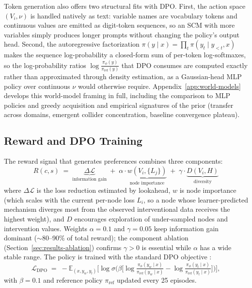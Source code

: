 \documentclass{article}
\theoremstyle{plain}
\theoremstyle{definition}
\theoremstyle{remark}
\begin{document}
Token generation also offers two structural fits with DPO. First, the action space $(V_i, \nu)$ is handled natively as text: variable names are vocabulary tokens and continuous values are emitted as digit-token sequences, so an SCM with more variables simply produces longer prompts without changing the policy's output head. Second, the autoregressive factorization $\pi(y \mid x) = \prod_t \pi(y_t \mid y_{<t}, x)$ makes the sequence log-probability a closed-form sum of per-token log-softmaxes, so the log-probability ratios $\log\tfrac{\pi_\phi(y)}{\pi_\text{ref}(y)}$ that DPO consumes are computed exactly rather than approximated through density estimation, as a Gaussian-head MLP policy over continuous $\nu$ would otherwise require. Appendix~\ref{app:world-models} develops this world-model framing in full, including the comparison to MLP policies and greedy acquisition and empirical signatures of the prior (transfer across domains, emergent collider concentration, baseline convergence plateau).

\subsection{Reward and DPO Training}
\label{sec:dpo}

The reward signal that generates preferences combines three components:
\begin{equation}
\label{eq:reward}
R(c, s) \;=\; \underbrace{\Delta\mathcal{L}}_{\text{information gain}} \;+\; \alpha \cdot \underbrace{w(V_i, \{L_j\})}_{\text{node importance}} \;+\; \gamma \cdot \underbrace{D(V_i, H)}_{\text{diversity}}
\end{equation}
where $\Delta\mathcal{L}$ is the loss reduction estimated by lookahead, $w$ is node importance (which scales with the current per-node loss $L_i$, so a node whose learner-predicted mechanism diverges most from the observed interventional data receives the highest weight), and $D$ encourages exploration of under-sampled nodes and intervention values. Weights $\alpha = 0.1$ and $\gamma = 0.05$ keep information gain dominant ($\sim$80--90\% of total reward); the component ablation (Section~\ref{sec:results-ablation}) confirms $\gamma > 0$ is essential while $\alpha$ has a wide stable range. The policy is trained with the standard DPO objective \citep{rafailov2023direct}:
\begin{equation}
\label{eq:dpo-loss}
\mathcal{L}_{\text{DPO}} \;=\; -\mathbb{E}_{(x, y_w, y_l)}\Big[\log\sigma\Big(\beta\big[\log\tfrac{\pi_\phi(y_w \mid x)}{\pi_\text{ref}(y_w \mid x)} - \log\tfrac{\pi_\phi(y_l \mid x)}{\pi_\text{ref}(y_l \mid x)}\big]\Big)\Big],
\end{equation}
with $\beta = 0.1$ and reference policy $\pi_\text{ref}$ updated every 25 episodes.
\end{document}
